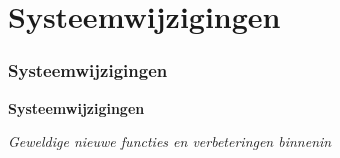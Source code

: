 %

\section{Systeemwijzigingen}
\begin{frame}[fragile]
	\frametitle{Systeemwijzigingen}

	\begin{center}\huge{\color{typo3darkgrey}\textbf{Systeemwijzigingen}}\end{center}
	\begin{center}\large{\textit{Geweldige nieuwe functies en verbeteringen binnenin}}\end{center}

\end{frame}

